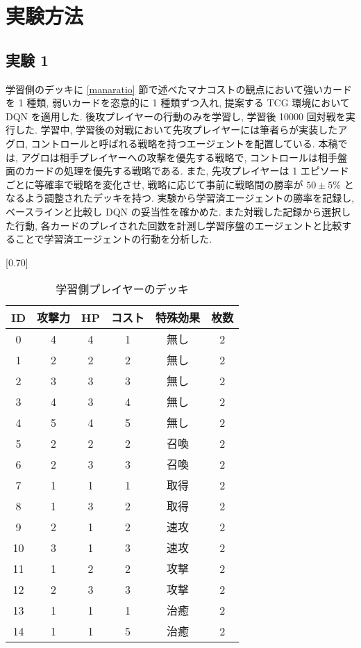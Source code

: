 \documentclass[twocolumn]{jarticle}     %
\begin{document}
\section{実験方法}
\subsection{実験 1}
学習側のデッキに \ref{manaratio} 節で述べたマナコストの観点において強いカードを 1 種類, 弱いカードを恣意的に 1 種類ずつ入れ, 提案する TCG 環境において DQN を適用した. 後攻プレイヤーの行動のみを学習し, 学習後 10000 回対戦を実行した. 学習中, 学習後の対戦において先攻プレイヤーには筆者らが実装したアグロ, コントロールと呼ばれる戦略を持つエージェントを配置している. 本稿では, アグロは相手プレイヤーへの攻撃を優先する戦略で, コントロールは相手盤面のカードの処理を優先する戦略である. また, 先攻プレイヤーは 1 エピソードごとに等確率で戦略を変化させ, 戦略に応じて事前に戦略間の勝率が $50 \pm 5\%$ となるよう調整されたデッキを持つ. 
実験から学習済エージェントの勝率を記録し, ベースラインと比較し DQN の妥当性を確かめた. また対戦した記録から選択した行動, 各カードのプレイされた回数を計測し学習序盤のエージェントと比較することで学習済エージェントの行動を分析した.
\begin{table}[t]
   \centering
   \caption{学習側プレイヤーのデッキ}
   \label{table:OPdeck}
   \vspace{-0.3cm}
   \scalebox{0.70}[0.70]{
     \begin{tabular}{|c|c|c|c|c|c|}
       \hline
       ID & 攻撃力 & HP & コスト & 特殊効果 & 枚数 \\ \hline
       0 & 4 & 4 & 1 & 無し & 2 \\ \hline
       1 & 2 & 2 & 2 & 無し & 2 \\ \hline
       2 & 3 & 3 & 3 & 無し & 2 \\ \hline
       3 & 4 & 3 & 4 & 無し & 2 \\ \hline
       4 & 5 & 4 & 5 & 無し & 2 \\ \hline
       5 & 2 & 2 & 2 & 召喚 & 2 \\ \hline
       6 & 2 & 3 & 3 & 召喚 & 2 \\ \hline
       7 & 1 & 1 & 1 & 取得 & 2 \\ \hline
       8 & 1 & 3 & 2 & 取得 & 2 \\ \hline
       9 & 2 & 1 & 2 & 速攻 & 2 \\ \hline
       10 & 3 & 1 & 3 & 速攻 & 2 \\ \hline
       11 & 1 & 2 & 2 & 攻撃 & 2 \\ \hline
       12 & 2 & 3 & 3 & 攻撃 & 2 \\ \hline
       13 & 1 & 1 & 1 & 治癒 & 2 \\ \hline
       14 & 1 & 1 & 5 & 治癒 & 2 \\ \hline
       \end{tabular}
   }
   
   \end{table}
\end{document}

